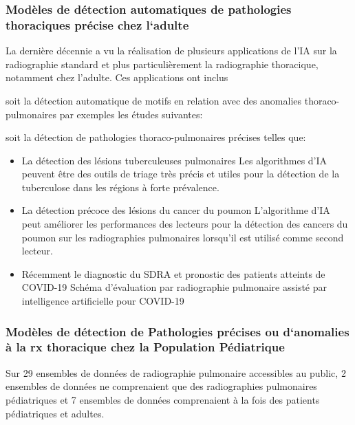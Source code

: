             \subsubsection{Modèles de détection automatiques de pathologies thoraciques précise chez l‘adulte}
            La dernière décennie a vu la réalisation de plusieurs applications de l'IA sur la radiographie standard et plus particulièrement la radiographie thoracique, notamment chez l'adulte.
            Ces applications ont inclus 
            
            soit la détection automatique de motifs en relation avec des anomalies thoraco-pulmonaires par exemples les études suivantes:
            
            soit la détection de pathologies thoraco-pulmonaires précises telles que:
            
            \begin{itemize}[label=$\bullet$]
                \item La détection des lésions tuberculeuses pulmonaires
                \hspace*{1cm}Les algorithmes d'IA peuvent être des outils de triage très précis et utiles pour la détection de la tuberculose dans les régions à forte prévalence.
                \item La détection précoce des lésions du cancer du poumon
                \hspace*{1cm}L'algorithme d'IA peut améliorer les performances des lecteurs pour la détection des cancers du poumon sur les radiographies pulmonaires lorsqu'il est utilisé comme second lecteur.
                \item Récemment le diagnostic du SDRA et pronostic des patients atteints de COVID-19
                \hspace*{1cm}Schéma d'évaluation par radiographie pulmonaire assisté par intelligence artificielle pour COVID-19
            \end{itemize}

            \subsubsection{Modèles de détection de Pathologies précises ou d‘anomalies à la rx thoracique chez la Population Pédiatrique}

                Sur 29 ensembles de données de radiographie pulmonaire accessibles au public, 2 ensembles de données ne comprenaient que des radiographies pulmonaires pédiatriques et 7 ensembles de données comprenaient à la fois des patients pédiatriques et adultes. 

